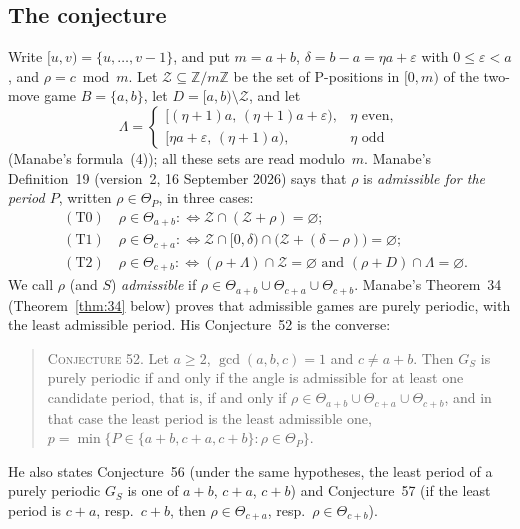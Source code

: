 \documentclass[11pt]{amsart}
\theoremstyle{definition}
\numberwithin{equation}{section}
\newcommand{\Z}{\mathcal{Z}}
\newcommand{\Th}[1]{\Theta_{#1}}
\begin{document}
\subsection{The conjecture}
Write $[u,v)=\{u,\dots,v-1\}$, and put $m=a+b$, $\delta=b-a=\eta a+\varepsilon$ with
$0\le\varepsilon<a$, and $\rho=c\bmod m$. Let $\Z\subseteq\mathbb{Z}/m\mathbb{Z}$ be the set
of P-positions in $[0,m)$ of the two-move game $B=\{a,b\}$, let $D=[a,b)\setminus\Z$, and let
\[
\Lambda=\begin{cases}\bigl[(\eta+1)a,\,(\eta+1)a+\varepsilon\bigr), & \eta \text{ even},\\
\bigl[\eta a+\varepsilon,\,(\eta+1)a\bigr), & \eta\text{ odd}\end{cases}
\]
(Manabe's formula~(4)); all these sets are read modulo~$m$. Manabe's Definition~19
(version~2, 16 September 2026) says that $\rho$ is \emph{admissible for the period $P$},
written $\rho\in\Th{P}$, in three cases:
\begin{align*}
&(\mathrm{T0})\quad \rho\in\Th{a+b} :\Longleftrightarrow \Z\cap(\Z+\rho)=\varnothing;\\
&(\mathrm{T1})\quad \rho\in\Th{c+a} :\Longleftrightarrow \Z\cap[0,\delta)\cap\bigl(\Z+(\delta-\rho)\bigr)=\varnothing;\\
&(\mathrm{T2})\quad \rho\in\Th{c+b} :\Longleftrightarrow (\rho+\Lambda)\cap\Z=\varnothing \text{ and } (\rho+D)\cap\Lambda=\varnothing.
\end{align*}
We call $\rho$ (and $S$) \emph{admissible} if $\rho\in\Th{a+b}\cup\Th{c+a}\cup\Th{c+b}$.
Manabe's Theorem~34 (Theorem~\ref{thm:34} below) proves that admissible games are purely
periodic, with the least admissible period. His Conjecture~52 is the converse:
\begin{quote}\small
\textsc{Conjecture 52.} Let $a\geqslant 2$, $\gcd(a,b,c)=1$ and $c\neq a+b$. Then $G_S$ is
purely periodic if and only if the angle is admissible for at least one candidate period,
that is, if and only if $\rho\in\Th{a+b}\cup\Th{c+a}\cup\Th{c+b}$, and in that case the least
period is the least admissible one, $p=\min\{P\in\{a+b,c+a,c+b\}:\rho\in\Th{P}\}$.
\end{quote}
He also states Conjecture~56 (under the same hypotheses, the least period of a purely
periodic $G_S$ is one of $a+b$, $c+a$, $c+b$) and Conjecture~57 (if the least period is
$c+a$, resp.\ $c+b$, then $\rho\in\Th{c+a}$, resp.\ $\rho\in\Th{c+b}$).
\end{document}
